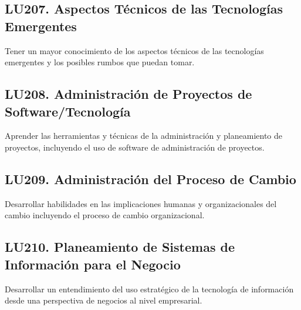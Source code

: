 \subsection{LU207. Aspectos Técnicos de las Tecnologías Emergentes}\label{sec:BOK-LU207}\label{sec:LU207}
\begin{LearningUnit}
\begin{LUGoal}
\item Tener un mayor conocimiento de los aspectos técnicos de las tecnologías emergentes y los posibles rumbos que puedan tomar.
\end{LUGoal}

\end{LearningUnit}

\subsection{LU208. Administración de Proyectos de Software/Tecnología}\label{sec:BOK-LU208}\label{sec:LU208}
\begin{LearningUnit}
\begin{LUGoal}
\item Aprender las herramientas y técnicas de la administración y planeamiento de proyectos, incluyendo el uso de software de administración de proyectos.
\end{LUGoal}

\end{LearningUnit}

\subsection{LU209. Administración del Proceso de Cambio}\label{sec:BOK-LU209}\label{sec:LU209}
\begin{LearningUnit}
\begin{LUGoal}
\item Desarrollar habilidades en las implicaciones humanas y organizacionales del cambio incluyendo el proceso de cambio organizacional.
\end{LUGoal}

\end{LearningUnit}

\subsection{LU210. Planeamiento de Sistemas de Información para el Negocio}\label{sec:BOK-LU210}\label{sec:LU210}
\begin{LearningUnit}
\begin{LUGoal}
\item Desarrollar un entendimiento del uso estratégico de la tecnología de información desde una perspectiva de negocios al nivel empresarial.
\end{LUGoal}

\end{LearningUnit}

